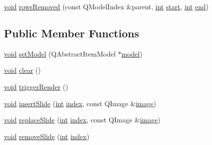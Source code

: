 \begin{DoxyCompactItemize}
\item 
\hyperlink{group___u_a_v_objects_plugin_ga444cf2ff3f0ecbe028adce838d373f5c}{void} \hyperlink{class_qxt_flow_view_private_a676be5362deb9ab5d3ff886f6b461fa0}{rows\-Removed} (const Q\-Model\-Index \&parent, \hyperlink{ioapi_8h_a787fa3cf048117ba7123753c1e74fcd6}{int} \hyperlink{glext_8h_a13be19455586e95d5a42ed8f054afad2}{start}, \hyperlink{ioapi_8h_a787fa3cf048117ba7123753c1e74fcd6}{int} \hyperlink{glext_8h_a432111147038972f06e049e18a837002}{end})
\end{DoxyCompactItemize}
\subsection*{Public Member Functions}
\begin{DoxyCompactItemize}
\item 
\hyperlink{group___u_a_v_objects_plugin_ga444cf2ff3f0ecbe028adce838d373f5c}{void} \hyperlink{class_qxt_flow_view_private_afc5b7adad03a87cd48b1340304c9c831}{set\-Model} (Q\-Abstract\-Item\-Model $\ast$\hyperlink{class_qxt_flow_view_private_ab87088917a257e0d72f091cff5031b9c}{model})
\item 
\hyperlink{group___u_a_v_objects_plugin_ga444cf2ff3f0ecbe028adce838d373f5c}{void} \hyperlink{class_qxt_flow_view_private_a83f1d60938ec9f3bd278bda21f3e32db}{clear} ()
\item 
\hyperlink{group___u_a_v_objects_plugin_ga444cf2ff3f0ecbe028adce838d373f5c}{void} \hyperlink{class_qxt_flow_view_private_ab0e169d7c9355ae590cb549b97bb2335}{trigger\-Render} ()
\item 
\hyperlink{group___u_a_v_objects_plugin_ga444cf2ff3f0ecbe028adce838d373f5c}{void} \hyperlink{class_qxt_flow_view_private_a4bb11550870351064968fba624421e5c}{insert\-Slide} (\hyperlink{ioapi_8h_a787fa3cf048117ba7123753c1e74fcd6}{int} \hyperlink{glext_8h_ab47dd9958bcadea08866b42bf358e95e}{index}, const Q\-Image \&\hyperlink{glext_8h_a4f252db605f5b9117603096756e79824}{image})
\item 
\hyperlink{group___u_a_v_objects_plugin_ga444cf2ff3f0ecbe028adce838d373f5c}{void} \hyperlink{class_qxt_flow_view_private_acb8e7ea051e50894ce5818b0cefa4b8b}{replace\-Slide} (\hyperlink{ioapi_8h_a787fa3cf048117ba7123753c1e74fcd6}{int} \hyperlink{glext_8h_ab47dd9958bcadea08866b42bf358e95e}{index}, const Q\-Image \&\hyperlink{glext_8h_a4f252db605f5b9117603096756e79824}{image})
\item 
\hyperlink{group___u_a_v_objects_plugin_ga444cf2ff3f0ecbe028adce838d373f5c}{void} \hyperlink{class_qxt_flow_view_private_ac650a14ae3eb35bc58eb15f09cefe6b2}{remove\-Slide} (\hyperlink{ioapi_8h_a787fa3cf048117ba7123753c1e74fcd6}{int} \hyperlink{glext_8h_ab47dd9958bcadea08866b42bf358e95e}{index})

\end{DoxyCompactItemize}
